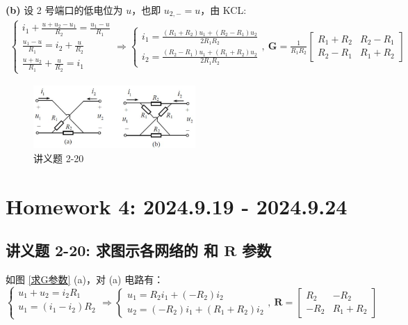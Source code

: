 \documentclass[UTF8]{report}
\theoremstyle{MyLineTheoremStyle} %
\theoremstyle{MyBlockTheoremStyle} %
\theoremstyle{MySubsubsectionStyle} %
\begin{document}
\textbf{(b)} 设 2 号端口的低电位为 $u$，也即 $u_{2,-} = u$，由 KCL: 
\begin{gather}
\begin{cases}
    i_1 + \frac{u+u_2 - u_1}{R_2} = \frac{u_1 - u}{R_1} \\ 
    \frac{u_1 - u}{R_1} = i_2 + \frac{u}{R_2} \\ 
    \frac{u+u_2}{R_1} + \frac{u}{R_2} = i_1
\end{cases}
\Longrightarrow 
\begin{cases}
    i_1 = \frac{(R_1 + R_2)u_1 + (R_2 - R_1)u_2}{2R_1R_2}\\ 
    i_2 = \frac{(R_2 - R_1)u_1 + (R_1 + R_2)u_2}{2R_1R_2}
\end{cases},\ 
\boldsymbol{G} =
\frac{1}{R_1R_2} 
\begin{bmatrix}
    R_1 + R_2 & R_2 - R_1 \\ 
    R_2 - R_1 & R_1 + R_2
\end{bmatrix}
\end{gather}

\begin{figure}[H]\centering
\includegraphics[width=0.55\textwidth]{assets/3/image (8).jpg}
\caption{ 讲义题 2-20}\label{讲义题 2-20}
\end{figure}


\chapter{Homework 4: 2024.9.19 - 2024.9.24}
\thispagestyle{fancy}

\section{讲义题 2-20: 求图示各网络的 和 $\boldsymbol{R}$ 参数}


如图 \ref{求G参数} (a)，对 (a) 电路有：
\begin{equation}
\begin{cases}
    u_1 + u_2 = i_2R_1 \\ 
    u_1 = (i_1 - i_2)R_2 \\ 
\end{cases}
\Longrightarrow 
\begin{cases}
    u_1 = R_2 i_1 + (-R_2)i_2 \\ 
    u_2 = (-R_2)i_1 + (R_1+R_2)i_2
\end{cases},\ 
\boldsymbol{R} = 
\begin{bmatrix}
    R_2 & -R_2 \\ 
    -R_2 & R_1+R_2
\end{bmatrix}
\end{equation}
\end{document}
